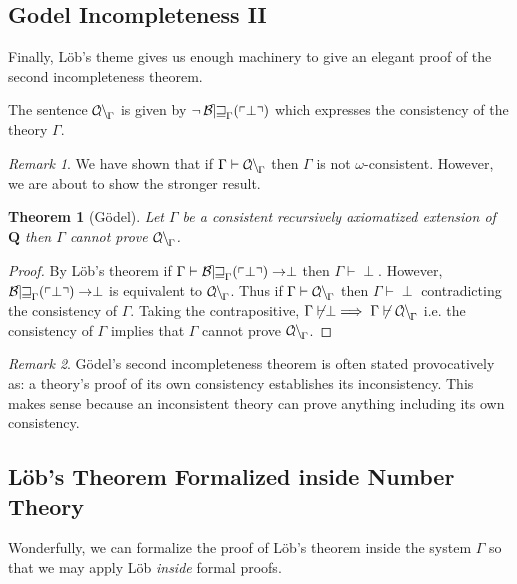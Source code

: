 \documentclass[12pt, leqno]{article}
\renewcommand{\bf}[1]{\mathbf{#1}}
\newcommand{\proves}{\vdash}
\newenvironment{definition}[1][Definition:]{\begin{trivlist}
\item[\hskip \labelsep {\bfseries #1}]}{\end{trivlist}}
\theoremstyle{theorem}
\newtheorem{theorem}{Theorem}[section]
\theoremstyle{definition}
\theoremstyle{definition}
\theoremstyle{remark}
\theoremstyle{definition}
\theoremstyle{remark}
\newtheorem{remark}{Remark}[subsection]
\DeclareMathOperator{\Con}{\mathcal{C\mkern-3mu o\mkern-1mu n\mkern-1.5mu}}
\begin{document}
\subsection{Godel Incompleteness II}

Finally, L\"{o}b's theme gives us enough machinery to give an elegant proof of the second incompleteness theorem. 

\begin{definition}
The sentence $\Con_{\Gamma}$ is given by $\neg \operatorname{\mathcal{B\mkern-2.0mu e\mkern-2.0mu w\mkern-1mu}}_{\Gamma}(\left\ulcorner \perp \right\urcorner)$ which expresses the consistency of the theory $\Gamma$.
\end{definition}

\begin{remark}
We have shown that if $\Gamma \proves \Con_{\Gamma}$ then $\Gamma$ is not $\omega$-consistent. However, we are about to show the stronger result. 
\end{remark}

\begin{theorem}[G\"{o}del]
Let $\Gamma$ be a consistent recursively axiomatized extension of $\bf{Q}$ then $\Gamma$ cannot prove $\Con_{\Gamma}$. 
\end{theorem}

\begin{proof}
By L\"{o}b's theorem if $\Gamma \proves \Thm{\perp} \to \perp$ then $\Gamma \proves \perp$. However, $\operatorname{\mathcal{B\mkern-2.0mu e\mkern-2.0mu w\mkern-1mu}}_{\Gamma}(\left\ulcorner \perp \right\urcorner) \to \perp$ is equivalent to $\Con_{\Gamma}$. Thus if $\Gamma \proves \Con_{\Gamma}$ then $\Gamma \proves \perp$ contradicting the consistency of $\Gamma$. Taking the contrapositive, $\Gamma \not\proves \perp \implies \Gamma \not\proves \Con_{\Gamma}$ i.e. the consistency of $\Gamma$ implies  that $\Gamma$ cannot prove $\Con_{\Gamma}$.
\end{proof}

\begin{remark}
G\"{o}del's second incompleteness theorem is often stated provocatively as: a theory's proof of its own consistency establishes its inconsistency. This makes sense because an inconsistent theory can prove anything including its own consistency. 
\end{remark}

\subsection{L\"{o}b's Theorem Formalized inside Number Theory}

Wonderfully, we can formalize the proof of L\"{o}b's theorem inside the system $\Gamma$ so that we may apply L\"{o}b \textit{inside} formal proofs.
\end{document}
